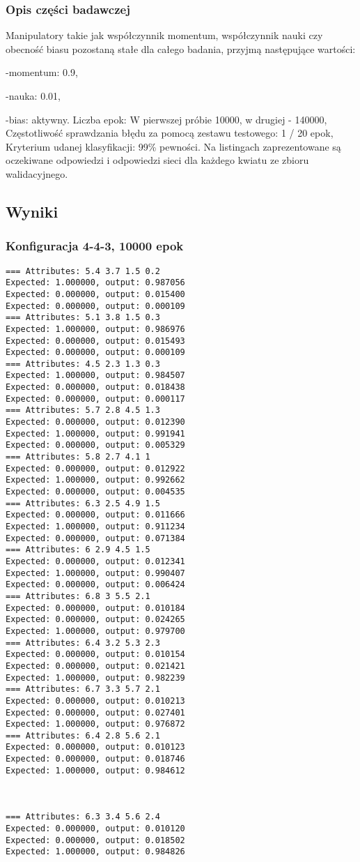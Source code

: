 \documentclass{classrep}
\begin{document}
\subsubsection{Opis części badawczej}
Manipulatory takie jak współczynnik momentum, współczynnik nauki czy obecność biasu pozostaną stałe dla całego badania, przyjmą następujące wartości:

-momentum: 0.9,

-nauka: 0.01,

-bias: aktywny.
\newline
Liczba epok: W pierwszej próbie 10000, w drugiej - 140000,
\newline
Częstotliwość sprawdzania błędu za pomocą zestawu testowego: 1 / 20 epok,
\newline
Kryterium udanej klasyfikacji: 99\% pewności.
\newline
Na listingach zaprezentowane są oczekiwane odpowiedzi i odpowiedzi sieci dla każdego kwiatu ze zbioru walidacyjnego.
\newpage
\subsection{Wyniki}
\subsubsection{Konfiguracja 4-4-3, 10000 epok}
\begin{lstlisting}[basicstyle=\small]
=== Attributes: 5.4 3.7 1.5 0.2
Expected: 1.000000, output: 0.987056
Expected: 0.000000, output: 0.015400
Expected: 0.000000, output: 0.000109
=== Attributes: 5.1 3.8 1.5 0.3 
Expected: 1.000000, output: 0.986976
Expected: 0.000000, output: 0.015493
Expected: 0.000000, output: 0.000109
=== Attributes: 4.5 2.3 1.3 0.3 
Expected: 1.000000, output: 0.984507
Expected: 0.000000, output: 0.018438
Expected: 0.000000, output: 0.000117
=== Attributes: 5.7 2.8 4.5 1.3 
Expected: 0.000000, output: 0.012390
Expected: 1.000000, output: 0.991941
Expected: 0.000000, output: 0.005329
=== Attributes: 5.8 2.7 4.1 1 
Expected: 0.000000, output: 0.012922
Expected: 1.000000, output: 0.992662
Expected: 0.000000, output: 0.004535
=== Attributes: 6.3 2.5 4.9 1.5 
Expected: 0.000000, output: 0.011666
Expected: 1.000000, output: 0.911234
Expected: 0.000000, output: 0.071384
=== Attributes: 6 2.9 4.5 1.5 
Expected: 0.000000, output: 0.012341
Expected: 1.000000, output: 0.990407
Expected: 0.000000, output: 0.006424
=== Attributes: 6.8 3 5.5 2.1 
Expected: 0.000000, output: 0.010184
Expected: 0.000000, output: 0.024265
Expected: 1.000000, output: 0.979700
=== Attributes: 6.4 3.2 5.3 2.3 
Expected: 0.000000, output: 0.010154
Expected: 0.000000, output: 0.021421
Expected: 1.000000, output: 0.982239
=== Attributes: 6.7 3.3 5.7 2.1 
Expected: 0.000000, output: 0.010213
Expected: 0.000000, output: 0.027401
Expected: 1.000000, output: 0.976872
=== Attributes: 6.4 2.8 5.6 2.1 
Expected: 0.000000, output: 0.010123
Expected: 0.000000, output: 0.018746
Expected: 1.000000, output: 0.984612



=== Attributes: 6.3 3.4 5.6 2.4 
Expected: 0.000000, output: 0.010120
Expected: 0.000000, output: 0.018502
Expected: 1.000000, output: 0.984826
\end{lstlisting}
\end{document}
